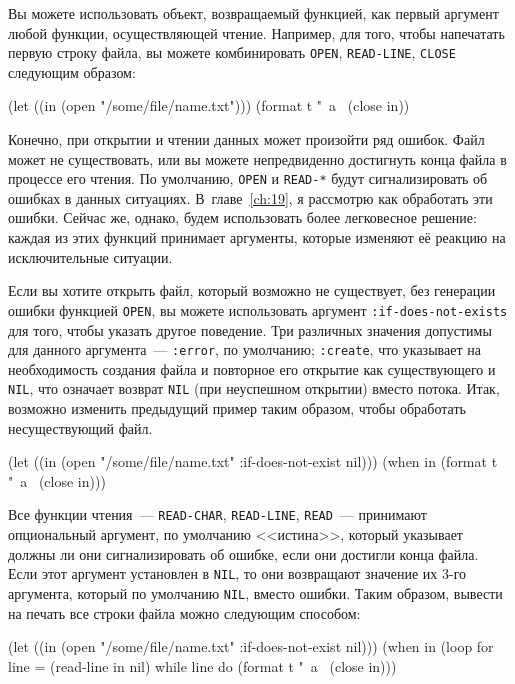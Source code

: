 Вы можете использовать объект, возвращаемый функцией, как первый аргумент любой функции,
осуществляющей чтение. Например, для того, чтобы напечатать первую строку файла, вы можете
комбинировать \lstinline{OPEN}, \lstinline{READ-LINE}, \lstinline{CLOSE} следующим образом:

\begin{myverb}
(let ((in (open "/some/file/name.txt")))
  (format t "~a~%
  (close in))
\end{myverb}

Конечно, при открытии и чтении данных может произойти ряд ошибок. Файл может не
существовать, или вы можете непредвиденно достигнуть конца файла в процессе его чтения. По
умолчанию, \lstinline{OPEN} и \lstinline{READ-*} будут сигнализировать об ошибках в данных
ситуациях. В~главе~\ref{ch:19}, я рассмотрю как обработать эти ошибки. Сейчас же, однако, будем
использовать более легковесное решение: каждая из этих функций принимает аргументы,
которые изменяют её реакцию на исключительные ситуации.

Если вы хотите открыть файл, который возможно не существует, без генерации ошибки
функцией \lstinline{OPEN}, вы можете использовать аргумент \lstinline{:if-does-not-exists} для того,
чтобы указать другое поведение. Три различных значения допустимы для данного аргумента~---
\lstinline{:error}, по умолчанию; \lstinline{:create}, что указывает на необходимость создания файла
и повторное его открытие как существующего и \lstinline{NIL}, что означает возврат \lstinline{NIL}
(при неуспешном открытии) вместо потока. Итак, возможно изменить предыдущий пример таким
образом, чтобы обработать несуществующий файл.

\begin{myverb}
(let ((in (open "/some/file/name.txt" :if-does-not-exist nil)))
  (when in
    (format t "~a~%
    (close in)))
\end{myverb}

Все функции чтения~--- \lstinline{READ-CHAR}, \lstinline{READ-LINE}, \lstinline{READ}~--- принимают
опциональный аргумент, по умолчанию <<истина>>, который указывает должны ли они
сигнализировать об ошибке, если они достигли конца файла. Если этот аргумент установлен в
\lstinline{NIL}, то они возвращают значение их 3-го аргумента, который по умолчанию \lstinline{NIL},
вместо ошибки. Таким образом, вывести на печать все строки файла можно следующим способом:

\begin{myverb}
(let ((in (open "/some/file/name.txt" :if-does-not-exist nil)))
  (when in
    (loop for line = (read-line in nil)
         while line do (format t "~a~%
    (close in)))
\end{myverb}

